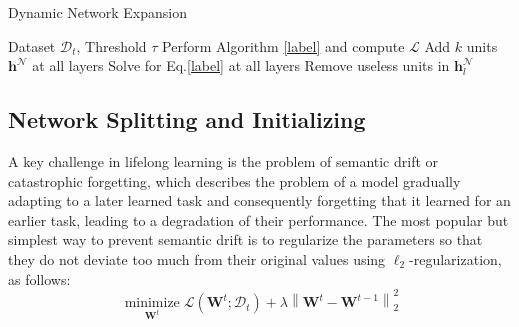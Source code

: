 \begin{algorithm}[h!]
	\caption{Dynamic Network Expansion}  
	\begin{algorithmic}[1]
		\Require Dataset $\mathcal{D}_t$, Threshold $\tau$
		\State Perform Algorithm \ref{label} and compute $\mathcal{L}$
		\State Add $k$ units $\bm{h}^\mathcal{N}$ at all layers
		\State Solve for Eq.\ref{label} at all layers
		\EndIf
		\State Remove useless units in $\bm{h}^\mathcal{N}_l$
		\EndFor
	\end{algorithmic} 
	\label{algorithm:3}
\end{algorithm}

\subsection{Network Splitting and Initializing}
A key challenge in lifelong learning is the problem of semantic drift or catastrophic forgetting, which describes the problem of a model gradually adapting to a later learned task and consequently forgetting that it learned for an earlier task, leading to a degradation of their performance. The most popular but simplest way to prevent semantic drift is to regularize the parameters so that they do not deviate too much from their original values using $\ell_{2}$-regularization, as follows:
$$
\underset{\boldsymbol{W}^{t}}{\operatorname{minimize}} \mathcal{L}\left(\boldsymbol{W}^{t} ; \mathcal{D}_{t}\right)+\lambda\left\|\boldsymbol{W}^{t}-\boldsymbol{W}^{t-1}\right\|_{2}^{2}
\label{eq:6}
$$

